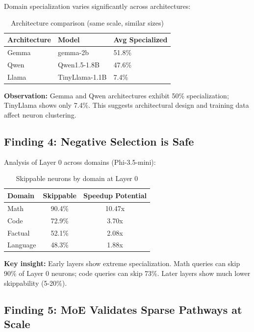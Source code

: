 \documentclass{article}
\begin{document}
Domain specialization varies significantly across architectures:

\begin{table}[h]
\centering
\caption{Architecture comparison (same scale, similar sizes)}
\label{tab:arch}
\begin{tabular}{lll}
\toprule
\textbf{Architecture} & \textbf{Model} & \textbf{Avg Specialized} \\
\midrule
Gemma & gemma-2b & 51.8\% \\
Qwen & Qwen1.5-1.8B & 47.6\% \\
Llama & TinyLlama-1.1B & 7.4\% \\
\bottomrule
\end{tabular}
\end{table}

\textbf{Observation:} Gemma and Qwen architectures exhibit 50\% specialization; TinyLlama shows only 7.4\%. This suggests architectural design and training data affect neuron clustering.

\subsection{Finding 4: Negative Selection is Safe}

Analysis of Layer 0 across domains (Phi-3.5-mini):

\begin{table}[h]
\centering
\caption{Skippable neurons by domain at Layer 0}
\label{tab:negative}
\begin{tabular}{lcc}
\toprule
\textbf{Domain} & \textbf{Skippable} & \textbf{Speedup Potential} \\
\midrule
Math & 90.4\% & 10.47x \\
Code & 72.9\% & 3.70x \\
Factual & 52.1\% & 2.08x \\
Language & 48.3\% & 1.88x \\
\bottomrule
\end{tabular}
\end{table}

\textbf{Key insight:} Early layers show extreme specialization. Math queries can skip 90\% of Layer 0 neurons; code queries can skip 73\%. Later layers show much lower skippability (5-20\%).

\subsection{Finding 5: MoE Validates Sparse Pathways at Scale}
\end{document}
